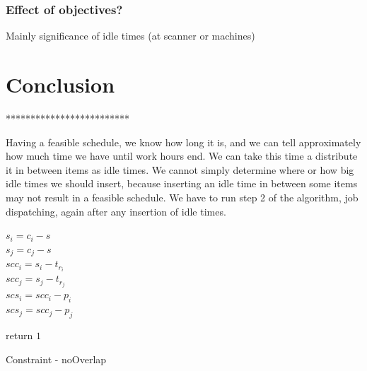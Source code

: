 \documentclass{ctuthesis}
\begin{document}
\subsection{Effect of objectives?}
Mainly significance of idle times (at scanner or machines)
\chapter{Conclusion}






*************************

Having a feasible schedule, we know how long it is, and we can tell approximately how much time we have until work hours end. We can take this time a distribute it in between items as idle times. We cannot simply determine where or how big idle times we should insert, because inserting an idle time in between some items may not result in a feasible schedule. We have to run step 2 of the algorithm, job dispatching, again after any insertion of idle times.


\label{overlap}
\begin{algorithm}[H]
\SetAlgoLined
{}

$s_i = c_i - s\;$\\
$s_j = c_j - s\;$\\
$scc_i = s_i - t_{r_i}\;$\\
$scc_j = s_j - t_{r_j}\;$\\

$scs_i = scc_i - p_i\;$\\
$scs_j = scc_j - p_j\;$



return $1\;$
 \caption{Constraint - noOverlap}
\end{algorithm}
\end{document}
